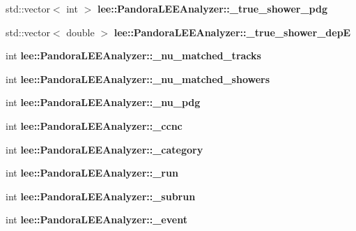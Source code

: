 \begin{DoxyCompactItemize}
\item 
\hypertarget{group__lee_gac1f312260669f165f847286e4512224d}{std\-::vector$<$ int $>$ {\bfseries lee\-::\-Pandora\-L\-E\-E\-Analyzer\-::\-\_\-true\-\_\-shower\-\_\-pdg}}\label{group__lee_gac1f312260669f165f847286e4512224d}

\item 
\hypertarget{group__lee_ga4f376ec3a74610d2b6e5ea3be722182c}{std\-::vector$<$ double $>$ {\bfseries lee\-::\-Pandora\-L\-E\-E\-Analyzer\-::\-\_\-true\-\_\-shower\-\_\-dep\-E}}\label{group__lee_ga4f376ec3a74610d2b6e5ea3be722182c}

\item 
\hypertarget{group__lee_gae2fc3e074f12a2847d68b4e3192c1151}{int {\bfseries lee\-::\-Pandora\-L\-E\-E\-Analyzer\-::\-\_\-nu\-\_\-matched\-\_\-tracks}}\label{group__lee_gae2fc3e074f12a2847d68b4e3192c1151}

\item 
\hypertarget{group__lee_gab254eacbf12abc1ac43236dfd2f7da16}{int {\bfseries lee\-::\-Pandora\-L\-E\-E\-Analyzer\-::\-\_\-nu\-\_\-matched\-\_\-showers}}\label{group__lee_gab254eacbf12abc1ac43236dfd2f7da16}

\item 
\hypertarget{group__lee_gaf5459aca7400b6346a489d293ffea411}{int {\bfseries lee\-::\-Pandora\-L\-E\-E\-Analyzer\-::\-\_\-nu\-\_\-pdg}}\label{group__lee_gaf5459aca7400b6346a489d293ffea411}

\item 
\hypertarget{group__lee_gaae937bb4d388fd91a62a76e251c56c93}{int {\bfseries lee\-::\-Pandora\-L\-E\-E\-Analyzer\-::\-\_\-ccnc}}\label{group__lee_gaae937bb4d388fd91a62a76e251c56c93}

\item 
\hypertarget{group__lee_gac54ac47f84c33553e01edb0419d78570}{int {\bfseries lee\-::\-Pandora\-L\-E\-E\-Analyzer\-::\-\_\-category}}\label{group__lee_gac54ac47f84c33553e01edb0419d78570}

\item 
\hypertarget{group__lee_ga7afce927e448af59dc3f03f6e2fcb911}{int {\bfseries lee\-::\-Pandora\-L\-E\-E\-Analyzer\-::\-\_\-run}}\label{group__lee_ga7afce927e448af59dc3f03f6e2fcb911}

\item 
\hypertarget{group__lee_ga566cffa1b58c7fc0566e696c6c8b8268}{int {\bfseries lee\-::\-Pandora\-L\-E\-E\-Analyzer\-::\-\_\-subrun}}\label{group__lee_ga566cffa1b58c7fc0566e696c6c8b8268}

\item 
\hypertarget{group__lee_gac635405f52f430a32515f06447b98ade}{int {\bfseries lee\-::\-Pandora\-L\-E\-E\-Analyzer\-::\-\_\-event}}\label{group__lee_gac635405f52f430a32515f06447b98ade}


\end{DoxyCompactItemize}
